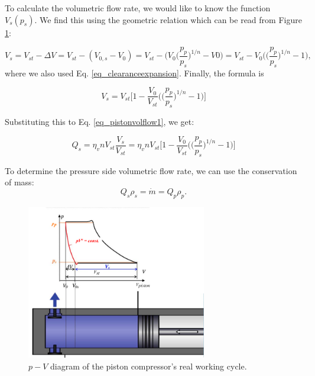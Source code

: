 To calculate the volumetric flow rate, we would like to know the function $V_s(p_s)$. We find this using the geometric relation which can be read from Figure \ref{pistoncomp_pv2}:

\begin{equation}
V_s = V_{st} - \Delta V = V_{st} - (V_{0,s} - V_0) = V_{st} - \Bigg( V_0 \Big( \frac{p_p}{p_s} \Big)^{1/n} - V0 \Bigg) = V_{st} -  V_0 \Bigg( \Big( \frac{p_p}{p_s} \Big)^{1/n} - 1 \Bigg),
\end{equation}
where we also used Eq. \ref{eq_clearanceexpansion}. Finally, the formula is 

\begin{equation}
V_s = V_{st} \Bigg[1-\frac{V_0}{V_{st}} \Bigg( \Big(\frac{p_p}{p_s}\Big)^{1/n} - 1 \Bigg) \Bigg]
\end{equation}

Substituting this to Eq. \ref{eq_pistonvolflow1}, we get:

\begin{equation} \label{pistoncomp_Qs}
Q_s = \eta_v n V_{st} \frac{V_s}{V_{st}} = \eta_v n V_{st} \Bigg[1-\frac{V_0}{V_{st}} \Bigg( \Big(\frac{p_p}{p_s}\Big)^{1/n} - 1 \Bigg) \Bigg]
\end{equation}

To determine the pressure side volumetric flow rate, we can use the conservation of mass:
\begin{equation}
Q_s \rho_s = \dot{m} =  Q_p \rho_p.
\end{equation}

\begin{figure}[!h]
\begin{center}
\includegraphics[width=0.7\textwidth]{figs/workcycle_real.png}
\caption{\label{pistoncomp_pv2} $p-V$ diagram of the piston compressor's real working cycle.}
\end{center}
\end{figure}



